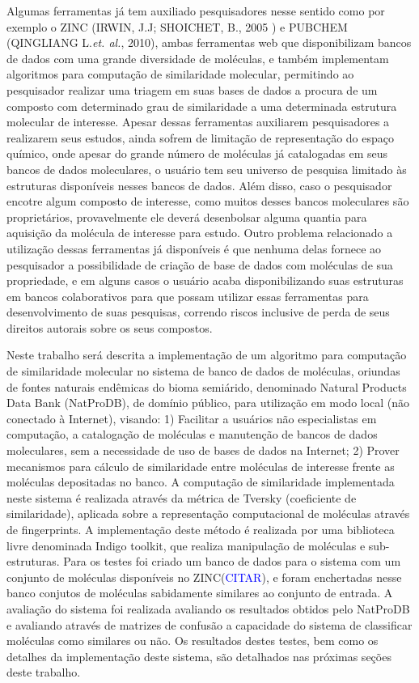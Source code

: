 Algumas ferramentas já tem auxiliado pesquisadores nesse sentido como por exemplo o ZINC (IRWIN, J.J; SHOICHET, B., 2005 ) e PUBCHEM (QINGLIANG L.{\it et. al.}, 2010), ambas ferramentas web que disponibilizam bancos de dados com uma grande diversidade de moléculas, e também implementam algoritmos para computação de similaridade molecular, permitindo ao pesquisador realizar uma triagem em suas bases de dados a procura de um composto com determinado grau de similaridade a uma determinada estrutura molecular de interesse. Apesar dessas ferramentas auxiliarem pesquisadores a realizarem seus estudos, ainda sofrem de limitação de representação do espaço químico, onde apesar do grande número de moléculas já catalogadas em seus bancos de dados moleculares, o usuário tem seu universo de pesquisa limitado às estruturas disponíveis nesses bancos de dados. Além disso, caso o pesquisador encotre algum composto de interesse, como muitos desses bancos moleculares são proprietários, provavelmente ele deverá desenbolsar alguma quantia para aquisição da molécula de interesse para estudo. Outro problema relacionado a utilização dessas ferramentas já disponíveis é que nenhuma delas fornece ao pesquisador a possibilidade de criação de base de dados com moléculas de sua propriedade, e em alguns casos o usuário acaba disponibilizando suas estruturas em bancos colaborativos para que possam utilizar essas ferramentas para desenvolvimento de suas pesquisas, correndo riscos inclusive de perda de seus direitos autorais sobre os  seus compostos.

Neste trabalho será descrita a implementação de um algoritmo para computação de similaridade molecular no sistema de banco de dados de moléculas, oriundas de fontes naturais endêmicas do bioma semiárido, denominado Natural Products Data Bank (NatProDB), de domínio público, para utilização em modo local (não conectado à Internet), visando: 1) Facilitar a usuários não especialistas em computação, a catalogação de moléculas e manutenção de bancos de dados moleculares, sem a necessidade de uso de bases de dados na Internet; 2) Prover mecanismos para cálculo de similaridade entre moléculas de interesse frente as moléculas depositadas no banco. A computação de similaridade implementada neste sistema é realizada através da métrica de Tversky (coeficiente de similaridade), aplicada sobre a representação computacional de moléculas através de fingerprints. A implementação deste método é realizada por uma biblioteca livre denominada Indigo toolkit, que realiza manipulação de moléculas e sub-estruturas. Para os testes foi criado um banco de dados para o sistema com um conjunto de moléculas disponíveis no ZINC(\textcolor{blue}{CITAR}), e foram enchertadas nesse banco conjutos de moléculas sabidamente similares ao conjunto de entrada. A avaliação do sistema foi realizada avaliando os resultados obtidos pelo NatProDB e avaliando através de matrizes de confusão a capacidade do sistema de classificar moléculas como similares ou não. Os resultados destes testes, bem como os detalhes da implementação deste sistema, são detalhados nas próximas seções deste trabalho.
                  

